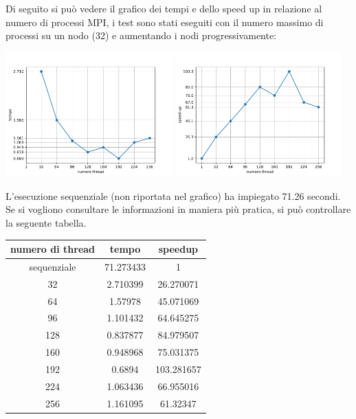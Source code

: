 \documentclass[12pt,openany]{report}
\begin{document}
Di seguito si può vedere il grafico dei tempi e dello speed up in relazione al numero di processi MPI, i test sono stati eseguiti con il numero massimo di processi su un nodo (32) e aumentando i nodi progressivamente:\begin{center}
    \includegraphics[width=0.48\textwidth ]{images/tempi_MPI.pdf}
    \includegraphics[width=0.48\textwidth ]{images/speedup_MPI.pdf}
\end{center}
L'esecuzione sequenziale (non riportata nel grafico) ha impiegato 71.26 secondi.
Se si vogliono consultare le informazioni in maniera più pratica, si può controllare la seguente tabella.\begin{center}
    \begin{tabular}{|c|c|c|}
        \hline
        \rowcolor[HTML]{EFEFEF} 
        numero di thread & tempo     & speedup    \\ \hline
        sequenziale      & 71.273433 & 1          \\ \hline
        32               & 2.710399  & 26.270071  \\ \hline
        64               & 1.57978   & 45.071069  \\ \hline
        96               & 1.101432  & 64.645275  \\ \hline
        128              & 0.837877  & 84.979507  \\ \hline
        160              & 0.948968  & 75.031375  \\ \hline
        192              & 0.6894    & 103.281657 \\ \hline
        224              & 1.063436  & 66.955016  \\ \hline
        256              & 1.161095  & 61.32347   \\ \hline
        \end{tabular}
\end{center}
\end{document}

